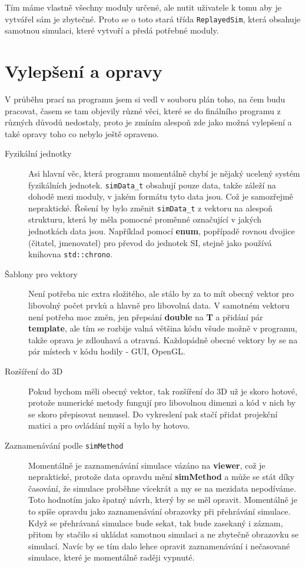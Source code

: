 Tím máme vlastně všechny moduly určené, ale nutit uživatele k tomu aby je vytvářel sám je zbytečné. Proto se o toto stará třída \texttt{ReplayedSim}, která obsahuje samotnou simulaci, které vytvoří a předá potřebné moduly.
\section{Vylepšení a opravy}
\label{sec:vylepseni}
V průběhu prací na programu jsem si vedl v souboru plán toho, na čem budu pracovat, časem se tam objevily různé věci, které se do finálního programu z různých důvodů nedostaly, proto je zmíním alespoň zde jako možná vylepšení a také opravy toho co nebylo ještě opraveno.

\begin{description}
	\item[Fyzikální jednotky] Asi hlavní věc, která programu momentálně chybí je nějaký ucelený systém fyzikálních jednotek. \texttt{simData\_t} obsahují pouze data, takže záleží na dohodě mezi moduly, v jakém formátu tyto data jsou. Což je samozřejmě nepraktické. Řešení by bylo změnit \texttt{simData\_t} z vektoru na alespoň strukturu, která by měla pomocné proměnné označující v jakých jednotkách data jsou. Například pomocí \textbf{enum}, popřípadě rovnou dvojice (čitatel, jmenovatel) pro převod do jednotek SI, stejně jako používá knihovna \texttt{std::chrono}.
	
	\item[Šablony pro vektory] Není potřeba nic extra složitého, ale stálo by za to mít obecný vektor pro libovolný počet prvků a hlavně pro libovolná data. V samotném vektoru není potřeba moc změn, jen přepsání \textbf{double} na \textbf{T} a přidání pár \textbf{template}, ale tím se rozbije valná většina kódu všude možně v programu, takže oprava je zdlouhavá a otravná.
	Každopádně obecné vektory by se na pár místech v kódu hodily - GUI, OpenGL.
	
	\item[Rozšíření do 3D] Pokud bychom měli obecný vektor, tak rozšíření do 3D už je skoro hotové, protože numerické metody fungují pro libovolnou dimenzi a kód v nich by se skoro přepisovat nemusel. Do vykreslení pak stačí přidat projekční matici a  pro ovládání myší a bylo by hotovo.
	
	\item[Zaznamenávání podle \texttt{simMethod}] Momentálně je zaznamenávání simulace vázáno na \textbf{viewer}, což je nepraktické, protože data opravdu mění \textbf{simMethod} a může se stát díky časování, že simulace proběhne vícekrát a my se na mezidata nepodíváme. Toto hodnotím jako špatný návrh, který by se měl opravit. Momentálně je to spíše opravdu jako zaznamenávání obrazovky při přehrávání simulace. Když se přehrávaná simulace bude sekat, tak bude zasekaný i záznam, přitom by stačilo si ukládat samotnou simulaci a ne zbytečně obrazovku se simulací. Navíc by se tím dalo lehce opravit zaznamenávání i nečasované simulace, které je momentálně raději vypnuté.
	

\end{description}
